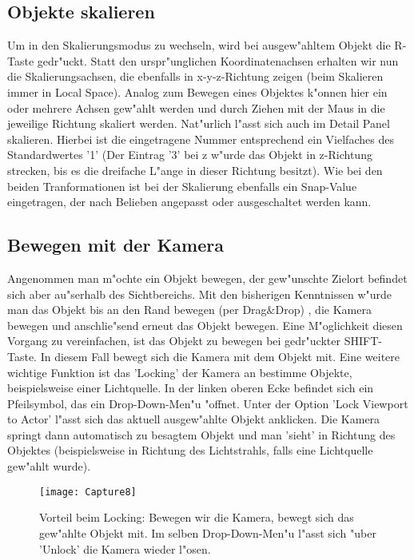 \documentclass[11pt, titlepage]{article}
\begin{document}
\subsection{Objekte skalieren}

\noindent Um in den Skalierungsmodus zu wechseln, wird bei ausgew"ahltem Objekt die R-Taste gedr"uckt. Statt den urspr"unglichen Koordinatenachsen erhalten wir nun die Skalierungsachsen, die ebenfalls in x-y-z-Richtung zeigen (beim Skalieren immer in Local Space). Analog zum Bewegen eines Objektes k"onnen hier ein oder mehrere Achsen gew"ahlt werden und durch Ziehen mit der Maus in die jeweilige Richtung skaliert werden. \newline
\noindent Nat"urlich l"asst sich auch im Detail Panel skalieren. Hierbei ist die eingetragene Nummer entsprechend ein Vielfaches des Standardwertes '1' (Der Eintrag '3' bei z w"urde das Objekt in z-Richtung strecken, bis es die dreifache L"ange in dieser Richtung besitzt).\newline
\noindent Wie bei den beiden Tranformationen ist bei der Skalierung ebenfalls ein Snap-Value eingetragen, der nach Belieben angepasst oder ausgeschaltet werden kann. 
\subsection{Bewegen mit der Kamera}

\noindent Angenommen man m"ochte ein Objekt bewegen, der gew"unschte Zielort befindet sich aber au"serhalb des Sichtbereichs. Mit den bisherigen Kenntnissen w"urde man das Objekt bis an den Rand bewegen (per Drag$\&$Drop) , die Kamera bewegen und anschlie"send erneut das Objekt bewegen. Eine M"oglichkeit diesen Vorgang zu vereinfachen, ist das Objekt zu bewegen bei gedr"uckter SHIFT-Taste. In diesem Fall bewegt sich die Kamera mit dem Objekt mit. \newline
\noindent Eine weitere wichtige Funktion ist das 'Locking' der Kamera an bestimme Objekte, beispielsweise einer Lichtquelle. In der linken oberen Ecke befindet sich ein Pfeilsymbol, das ein Drop-Down-Men"u "offnet. Unter der Option 'Lock Viewport to Actor' l"asst sich das aktuell ausgew"ahlte Objekt anklicken. Die Kamera springt dann automatisch zu besagtem Objekt und man 'sieht' in Richtung des Objektes (beispielsweise in Richtung des Lichtstrahls, falls eine Lichtquelle gew"ahlt wurde).

\begin{figure}[h]
\texttt{[image: Capture8]}
\caption{Vorteil beim Locking: Bewegen wir die Kamera, bewegt sich das gew"ahlte Objekt mit. Im selben Drop-Down-Men"u l"asst sich "uber 'Unlock' die Kamera wieder l"osen.}
\end{figure}
\end{document}
